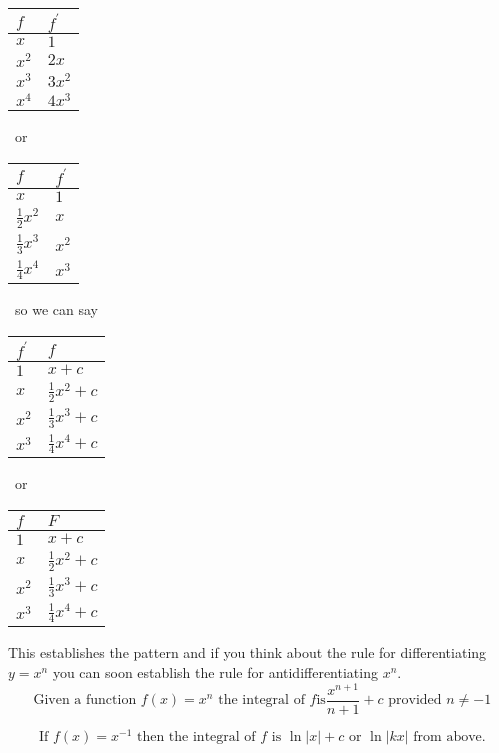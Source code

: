 \bigskip 
\begin{tabular}[c]{|l|l|}\hline
$f$  & $f^{ \prime }$  \\
\hline
$x$  & $1$  \\
\hline
$x^{2}$  & $2 x$  \\
\hline
$x^{3}$  & $3 x^{2}$  \\
\hline
$x^{4}$  & $4 x^{3}$  \\
\hline
\end{tabular}\ or
\
\begin{tabular}[c]{|l|l|}\hline
$f$  & $f^{ \prime }$  \\
\hline
$x$  & $1$  \\
\hline
$\frac{1}{2} x^{2}$  & $x$  \\
\hline
$\frac{1}{3} x^{3}$  & $x^{2}$  \\
\hline
$\frac{1}{4} x^{4}$  & $x^{3}$  \\
\hline
\end{tabular}\ so
we can say \
\begin{tabular}[c]{|l|l|}\hline
$f^{ \prime }$  & $f$  \\
\hline
$1$  & $x +c$  \\
\hline
$x$  & $\frac{1}{2} x^{2} +c$  \\
\hline
$x^{2}$  & $\frac{1}{3} x^{3} +c$  \\
\hline
$x^{3}$  & $\frac{1}{4} x^{4} +c$  \\
\hline
\end{tabular}\ or
\
\begin{tabular}[c]{|l|l|}\hline
$f$  & $F$  \\
\hline
$1$  & $x +c$  \\
\hline
$x$  & $\frac{1}{2} x^{2} +c$  \\
\hline
$x^{2}$  & $\frac{1}{3} x^{3} +c$  \\
\hline
$x^{3}$  & $\frac{1}{4} x^{4} +c$  \\
\hline
\end{tabular}

\bigskip This establishes the pattern and if you think about the rule for differentiating $y =x^{n}$ you can soon establish the rule for antidifferentiating $x^{n}$.
\begin{equation*}\text{ Given a function }f (x) =x^{n}\text{ the integral of }f\text{is}\frac{x^{n +1}}{n +1} +c\text{ provided }n \neq  -1
\end{equation*}

\begin{equation*}\text{ If }f (x) =x^{ -1}\text{ then the integral of }f\text{ is }\ln  \left \vert x\right \vert  +c\text{ or }\ln  \left \vert k x\right \vert \text{ from above.}
\end{equation*}

